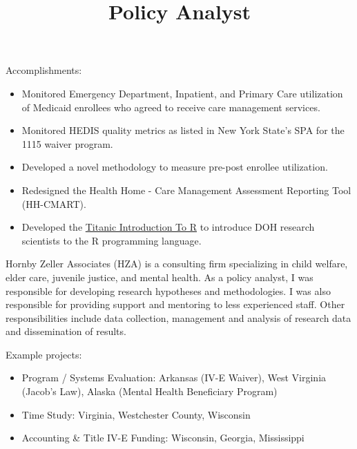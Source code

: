 \documentclass[line, margin, 10pt]{res}
\begin{document}
\begin{resume}
\begin{position}
    Accomplishments:
    \begin{itemize}
    \item Monitored Emergency Department, Inpatient, and Primary Care
      utilization of Medicaid enrollees who agreed to receive care
      management services.
    \item Monitored HEDIS quality metrics as listed in New York
      State’s SPA for the 1115 waiver program.
    \item Developed a novel methodology to measure pre-post enrollee utilization.
    \item Redesigned the Health Home - Care Management Assessment
      Reporting Tool (HH-CMART).
    \item Developed the
      \href{http://choens.github.io/titanic/}{Titanic Introduction To
        R} to introduce DOH research scientists to the R programming
      language.
    \end{itemize}
 
  \end{position}

  \title{Policy Analyst}
  \begin{position}
    Hornby Zeller Associates (HZA) is a consulting firm specializing
    in child welfare, elder care, juvenile justice, and mental
    health. As a policy analyst, I was responsible for developing
    research hypotheses and methodologies. I was also responsible for
    providing support and mentoring to less experienced staff. Other
    responsibilities include data collection, management and analysis
    of research data and dissemination of results.

    Example projects:
    \begin{itemize}
    \item Program / Systems Evaluation: Arkansas (IV-E Waiver), West
      Virginia (Jacob's Law), Alaska (Mental Health Beneficiary Program)
    \item Time Study: Virginia, Westchester County, Wisconsin
    \item Accounting \& Title IV-E Funding: Wisconsin, Georgia, Mississippi
    \end{itemize}


\end{position}
\end{resume}
\end{document}

